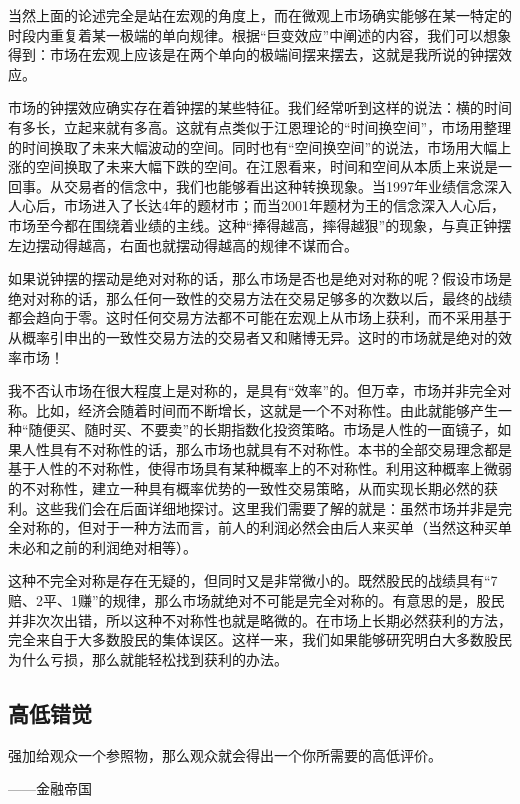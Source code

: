 当然上面的论述完全是站在宏观的角度上，而在微观上市场确实能够在某一特定的时段内重复着某一极端的单向规律。根据“巨变效应”中阐述的内容，我们可以想象得到：市场在宏观上应该是在两个单向的极端间摆来摆去，这就是我所说的钟摆效应。

市场的钟摆效应确实存在着钟摆的某些特征。我们经常听到这样的说法：横的时间有多长，立起来就有多高。这就有点类似于江恩理论的“时间换空间”，市场用整理的时间换取了未来大幅波动的空间。同时也有“空间换空间”的说法，市场用大幅上涨的空间换取了未来大幅下跌的空间。在江恩看来，时间和空间从本质上来说是一回事。从交易者的信念中，我们也能够看出这种转换现象。当1997年业绩信念深入人心后，市场进入了长达4年的题材市；而当2001年题材为王的信念深入人心后，市场至今都在围绕着业绩的主线。这种“捧得越高，摔得越狠”的现象，与真正钟摆左边摆动得越高，右面也就摆动得越高的规律不谋而合。

如果说钟摆的摆动是绝对对称的话，那么市场是否也是绝对对称的呢？假设市场是绝对对称的话，那么任何一致性的交易方法在交易足够多的次数以后，最终的战绩都会趋向于零。这时任何交易方法都不可能在宏观上从市场上获利，而不采用基于从概率引申出的一致性交易方法的交易者又和赌博无异。这时的市场就是绝对的效率市场！

我不否认市场在很大程度上是对称的，是具有“效率”的。但万幸，市场并非完全对称。比如，经济会随着时间而不断增长，这就是一个不对称性。由此就能够产生一种“随便买、随时买、不要卖”的长期指数化投资策略。市场是人性的一面镜子，如果人性具有不对称性的话，那么市场也就具有不对称性。本书的全部交易理念都是基于人性的不对称性，使得市场具有某种概率上的不对称性。利用这种概率上微弱的不对称性，建立一种具有概率优势的一致性交易策略，从而实现长期必然的获利。这些我们会在后面详细地探讨。这里我们需要了解的就是：虽然市场并非是完全对称的，但对于一种方法而言，前人的利润必然会由后人来买单（当然这种买单未必和之前的利润绝对相等）。

这种不完全对称是存在无疑的，但同时又是非常微小的。既然股民的战绩具有“7赔、2平、1赚”的规律，那么市场就绝对不可能是完全对称的。有意思的是，股民并非次次出错，所以这种不对称性也就是略微的。在市场上长期必然获利的方法，完全来自于大多数股民的集体误区。这样一来，我们如果能够研究明白大多数股民为什么亏损，那么就能轻松找到获利的办法。

\subsection{高低错觉}

{\kaishu
强加给观众一个参照物，那么观众就会得出一个你所需要的高低评价。

\hfill ——金融帝国
}

